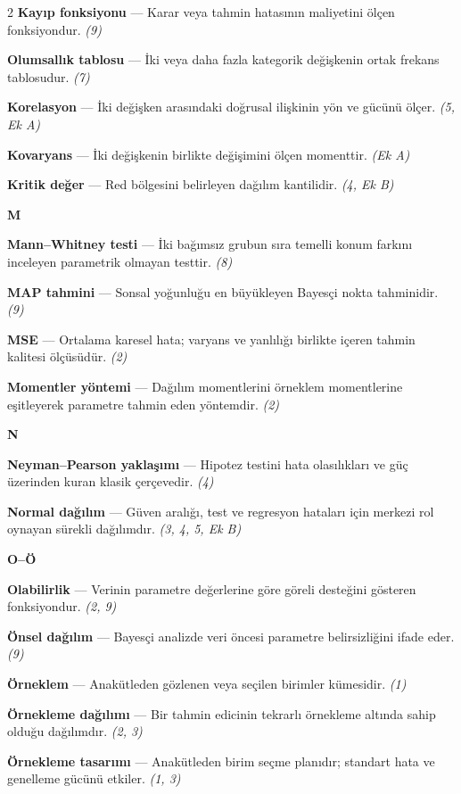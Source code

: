 \begin{multicols}{2}
\textbf{Kayıp fonksiyonu} --- Karar veya tahmin hatasının maliyetini ölçen fonksiyondur. \emph{(9)}\par
\textbf{Olumsallık tablosu} --- İki veya daha fazla kategorik değişkenin ortak frekans tablosudur. \emph{(7)}\par
\textbf{Korelasyon} --- İki değişken arasındaki doğrusal ilişkinin yön ve gücünü ölçer. \emph{(5, Ek A)}\par
\textbf{Kovaryans} --- İki değişkenin birlikte değişimini ölçen momenttir. \emph{(Ek A)}\par
\textbf{Kritik değer} --- Red bölgesini belirleyen dağılım kantilidir. \emph{(4, Ek B)}\par
\medskip
\noindent\textbf{\large M}\par\smallskip
\textbf{Mann--Whitney testi} --- İki bağımsız grubun sıra temelli konum farkını inceleyen parametrik olmayan testtir. \emph{(8)}\par
\textbf{MAP tahmini} --- Sonsal yoğunluğu en büyükleyen Bayesçi nokta tahminidir. \emph{(9)}\par
\textbf{MSE} --- Ortalama karesel hata; varyans ve yanlılığı birlikte içeren tahmin kalitesi ölçüsüdür. \emph{(2)}\par
\textbf{Momentler yöntemi} --- Dağılım momentlerini örneklem momentlerine eşitleyerek parametre tahmin eden yöntemdir. \emph{(2)}\par
\medskip
\noindent\textbf{\large N}\par\smallskip
\textbf{Neyman--Pearson yaklaşımı} --- Hipotez testini hata olasılıkları ve güç üzerinden kuran klasik çerçevedir. \emph{(4)}\par
\textbf{Normal dağılım} --- Güven aralığı, test ve regresyon hataları için merkezi rol oynayan sürekli dağılımdır. \emph{(3, 4, 5, Ek B)}\par
\medskip
\noindent\textbf{\large O--Ö}\par\smallskip
\textbf{Olabilirlik} --- Verinin parametre değerlerine göre göreli desteğini gösteren fonksiyondur. \emph{(2, 9)}\par
\textbf{Önsel dağılım} --- Bayesçi analizde veri öncesi parametre belirsizliğini ifade eder. \emph{(9)}\par
\textbf{Örneklem} --- Anakütleden gözlenen veya seçilen birimler kümesidir. \emph{(1)}\par
\textbf{Örnekleme dağılımı} --- Bir tahmin edicinin tekrarlı örnekleme altında sahip olduğu dağılımdır. \emph{(2, 3)}\par
\textbf{Örnekleme tasarımı} --- Anakütleden birim seçme planıdır; standart hata ve genelleme gücünü etkiler. \emph{(1, 3)}\par

\end{multicols}
